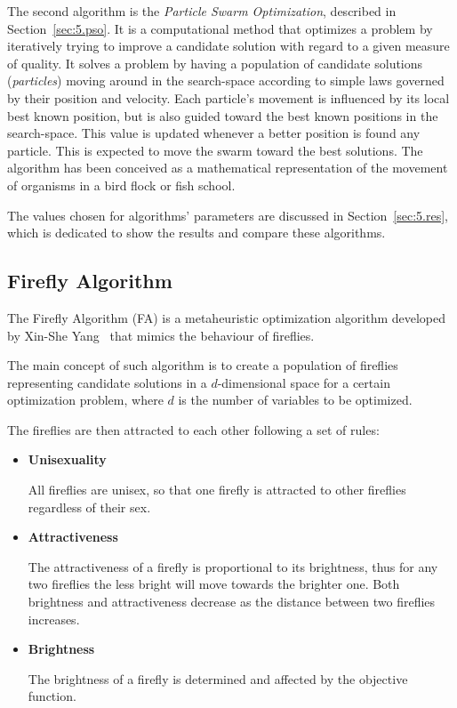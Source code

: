 The second algorithm is the \textit{Particle Swarm Optimization},
described in Section~\ref{sec:5.pso}. It is a computational method that optimizes a
problem by iteratively trying to improve a candidate solution with regard to a given
measure of quality. It solves a problem by having a population of candidate solutions
(\textit{particles}) moving around in the search-space according to simple laws
governed by their position and velocity.
Each particle's movement is influenced by its local best known position,
but is also guided toward the best known positions in the search-space.
This value is updated whenever a better position is found any particle.
This is expected to move the swarm toward the best solutions.
The algorithm has been conceived as a mathematical representation
of the movement of organisms in a bird flock or fish school.

The values chosen for algorithms' parameters are discussed in Section~\ref{sec:5.res},
which is dedicated to show the results and compare these algorithms.


\subsection{Firefly Algorithm}
\label{sec:5.fa}

The Firefly Algorithm (FA) is a metaheuristic optimization algorithm
developed by Xin-She Yang~\cite{yang2010nature} that mimics the behaviour
of fireflies.

The main concept of such algorithm is to create a population of fireflies
representing candidate solutions in a $d$-dimensional space 
for a certain optimization problem, where $d$ is the number of variables to be optimized.

The fireflies are then attracted to each other following a set of rules:

\begin{itemize}[noitemsep]
	\item \textbf{Unisexuality} 
	
	All fireflies are unisex, so that one firefly is attracted
	to other fireflies regardless of their sex.
	\item \textbf{Attractiveness}
	
	The attractiveness of a firefly is proportional to its brightness,
	thus for any two fireflies the less bright will move towards the brighter one.
	Both brightness and attractiveness decrease as the distance between
	two fireflies increases.
	\item \textbf{Brightness}
	
	The brightness of a firefly is determined and affected by the objective function.
\end{itemize}


